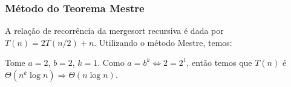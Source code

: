 \subsubsection{Método do Teorema Mestre}
A relação de recorrência da mergesort recursiva é dada por \( T(n) = 2T(n/2) + n \). Utilizando o método Mestre, temos:

Tome \( a = 2 \), \( b = 2 \), \( k = 1 \). Como \( a = b^k \Leftrightarrow 2 = 2^1 \), então temos que \( T(n) \) é \( \Theta(n^k \log{n}) \Rightarrow \Theta(n \log{n}) \).
